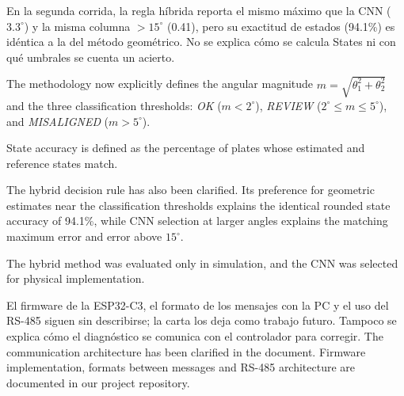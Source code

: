 \documentclass{LabDSTresponse}
\begin{document}
	{En la segunda corrida, la regla híbrida
		reporta el mismo máximo que la CNN
		($3.3^\circ$) y la misma columna
		$>15^\circ$ (0.41), pero su exactitud
		de estados (94.1\%) es idéntica a la del
		método geométrico. No se explica cómo
		se calcula States ni con qué umbrales
		se cuenta un acierto.}
	{The methodology now explicitly defines
		the angular magnitude
		$m=\sqrt{\theta_1^2+\theta_2^2}$
		and the three classification thresholds:
		\textit{OK} ($m<2^\circ$),
		\textit{REVIEW} ($2^\circ\leq m\leq5^\circ$),
		and \textit{MISALIGNED} ($m>5^\circ$).
		
		State accuracy is defined as the percentage
		of plates whose estimated and reference
		states match.
		
		The hybrid decision rule has also been
		clarified. Its preference for geometric
		estimates near the classification thresholds
		explains the identical rounded state accuracy
		of 94.1\%, while CNN selection at larger
		angles explains the matching maximum error
		and error above $15^\circ$.
		
		The hybrid method was evaluated only in
		simulation, and the CNN was selected
		for physical implementation.}
	
	{El firmware de la ESP32-C3, el formato
		de los mensajes con la PC y el uso del
		RS-485 siguen sin describirse; la carta
		los deja como trabajo futuro. Tampoco
		se explica cómo el diagnóstico se
		comunica con el controlador para corregir.}
	{The communication architecture has been clarified in the document. Firmware implementation, formats between messages and RS-485 architecture are documented in our project repository.}
	
	
\end{document}
